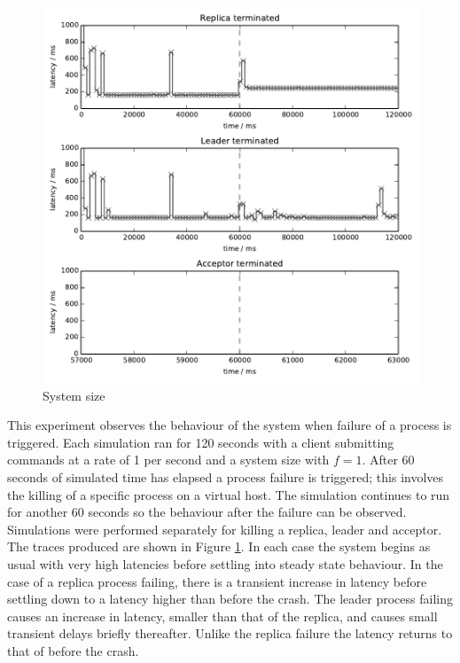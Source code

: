 \begin{figure}
  \centering
  \includegraphics{include/singe-crash-graph.pdf}
  \caption{System size}
  \label{fig:failure-traces}
\end{figure}

This experiment observes the behaviour of the system when failure of a process is triggered. Each simulation ran for 120 seconds with a client submitting commands at a rate of 1 per second and a system size with $f=1$. After 60 seconds of simulated time has elapsed a process failure is triggered; this involves the killing of a specific process on a virtual host. The simulation continues to run for another 60 seconds so the behaviour after the failure can be observed. Simulations were performed separately for killing a replica, leader and acceptor. \\

The traces produced are shown in Figure \ref{fig:failure-traces}. In each case the system begins as usual with very high latencies before settling into steady state behaviour. In the case of a replica process failing, there is a transient increase in latency before settling down to a latency higher than before the crash. The leader process failing causes an increase in latency, smaller than that of the replica, and causes small transient delays briefly thereafter. Unlike the replica failure the latency returns to that of before the crash. \\

